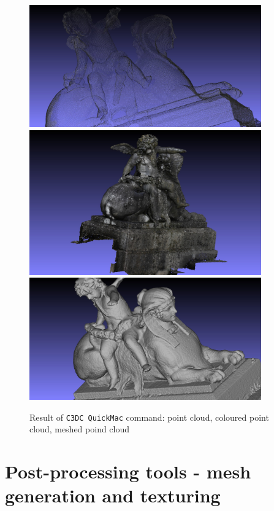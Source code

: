 \begin{figure}[H]
\begin{center}
\includegraphics[width=100mm]{FIGS/Ange/snapshot00.jpg}
\includegraphics[width=100mm]{FIGS/Ange/snapshot01.jpg}
\includegraphics[width=100mm]{FIGS/Ange/snapshot201.jpg}
\end{center}
\caption{Result of {\tt C3DC QuickMac} command: point cloud, coloured point cloud, meshed poind cloud}
\label{FIG:Angel:Result}
\end{figure}


\section{Post-processing tools - mesh generation and texturing}

